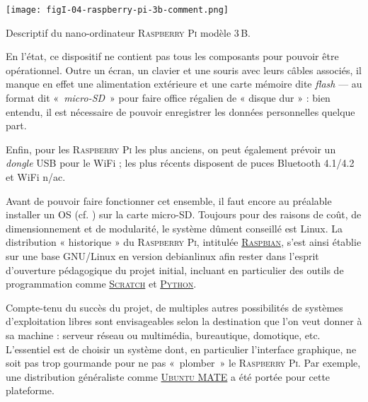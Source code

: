 

\begin{jazzfigure*}
  \texttt{[image: figI-04-raspberry-pi-3b-comment.png]}
  \vspace*{-\baselineskip}
  \caption{\label{fig:I.4}Descriptif du nano-ordinateur \textsc{Raspberry Pi} modèle 3\,B.}
\end{jazzfigure*}

En l'état, ce dispositif ne contient pas tous les composants pour pouvoir être opérationnel. Outre un écran, un clavier et une souris avec leurs câbles associés, il manque en effet une alimentation extérieure et une carte mémoire dite \textit{flash} --- au format dit «~\textit{micro-SD}~» pour faire office régalien de « disque dur » : bien entendu, il est nécessaire de pouvoir enregistrer les données personnelles quelque part.

Enfin, pour les \textsc{Raspberry Pi} les plus anciens, on peut également prévoir un \textit{dongle} USB pour le WiFi ; les plus récents disposent de puces Bluetooth 4.1/4.2 et WiFi n/ac.

Avant de pouvoir faire fonctionner cet ensemble, il faut encore au préalable installer un \gls{OS} (cf. \href{https://fr.wikipedia.org/wiki/Syst\%C3\%A8me_d'exploitation}{\faWikipediaW}) sur la carte micro-SD. Toujours pour des raisons de coût, de dimensionnement et de modularité, le système dûment conseillé est \gls{Linux}. La distribution « historique » du \textsc{Raspberry Pi}, intitulée \href{https://www.raspbian.org/}{\textsc{Raspbian}}, s'est ainsi établie sur une base \gls{GNU/Linux} en version \gls{debianlinux} afin rester dans l'esprit d'ouverture pédagogique du projet initial, incluant en particulier des outils de programmation comme \href{https://scratch.mit.edu/}{\textsc{Scratch}} et \href{https://www.python.org/}{\textsc{Python}}. 

Compte-tenu du succès du projet, de multiples autres possibilités de systèmes d'exploitation libres sont envisageables selon la destination que l'on veut donner à sa machine : serveur réseau ou multimédia, bureautique, domotique, etc. L'essentiel est de choisir un système dont, en particulier l'interface graphique, ne soit pas trop gourmande pour ne pas «~plomber~» le \textsc{Raspberry Pi}. Par exemple, une distribution généraliste comme \href{https://ubuntu-mate.org/}{\textsc{Ubuntu MATE}} a été portée pour cette plateforme.


